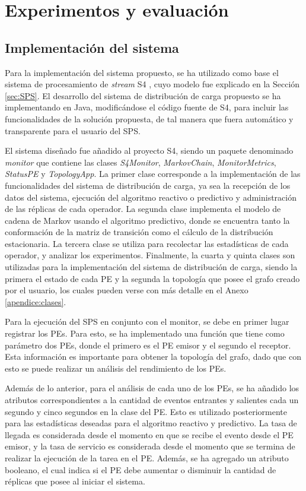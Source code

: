 \chapter{Experimentos y evaluación}
\label{cap:experimentos}

\section{Implementación del sistema}
Para la implementación del sistema propuesto, se ha utilizado como base el sistema de procesamiento de \textit{stream} S4 \citep{s4}, cuyo modelo fue explicado en la Sección \ref{sec:SPS}. El desarrollo del sistema de distribución de carga propuesto se ha implementando en Java, modificándose el código fuente de S4, para incluir las funcionalidades de la solución propuesta, de tal manera que fuera automático y transparente para el usuario del SPS.

El sistema diseñado fue añadido al proyecto S4, siendo un paquete denominado \textit{monitor} que contiene las clases \textit{S4Monitor}, \textit{MarkovChain}, \textit{MonitorMetrics}, \textit{StatusPE} y \textit{TopologyApp}. La primer clase corresponde a la implementación de las funcionalidades del sistema de distribución de carga, ya sea la recepción de los datos del sistema, ejecución del algoritmo reactivo o predictivo y administración de las réplicas de cada operador. La segunda clase implementa el modelo de cadena de Markov usando el algoritmo predictivo, donde se encuentra tanto la conformación de la matriz de transición como el cálculo de la distribución estacionaria. La tercera clase se utiliza para recolectar las estadísticas de cada operador, y analizar los experimentos. Finalmente, la cuarta y quinta clases son utilizadas para la implementación del sistema de distribución de carga, siendo la primera el estado de cada PE y la segunda la topología que posee el grafo creado por el usuario, los cuales pueden verse con más detalle en el Anexo \ref{apendice:clases}.

Para la ejecución del SPS en conjunto con el monitor, se debe en primer lugar registrar los PEs. Para esto, se ha implementado una función que tiene como parámetro dos PEs, donde el primero es el PE emisor y el segundo el receptor. Esta información es importante para obtener la topología del grafo, dado que con esto se puede realizar un análisis del rendimiento de los PEs.

Además de lo anterior, para el análisis de cada uno de los PEs, se ha añadido los atributos correspondientes a la cantidad de eventos entrantes y salientes cada un segundo y cinco segundos en la clase del PE. Esto es utilizado posteriormente para las estadísticas deseadas para el algoritmo reactivo y predictivo. La tasa de llegada es considerada desde el momento en que se recibe el evento desde el PE emisor, y la tasa de servicio es considerada desde el momento que se termina de realizar la ejecución de la tarea en el PE. Además, se ha agregado un atributo booleano, el cual indica si el PE debe aumentar o disminuir la cantidad de réplicas que posee al iniciar el sistema.

